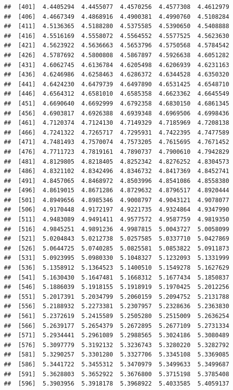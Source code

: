\documentclass[
  11pt]{report}
\begin{document}
\begin{itemize}
\begin{verbatim}
##  [401]  4.4405294  4.4455077  4.4570256  4.4577308  4.4612979
##  [406]  4.4667349  4.4868916  4.4900381  4.4990760  4.5108284
##  [411]  4.5136365  4.5188280  4.5375585  4.5390650  4.5408888
##  [416]  4.5516169  4.5558072  4.5564552  4.5577525  4.5623630
##  [421]  4.5623922  4.5636663  4.5653796  4.5750568  4.5784542
##  [426]  4.5787692  4.5800808  4.5867897  4.5926638  4.6051282
##  [431]  4.6062745  4.6136784  4.6205498  4.6206939  4.6231163
##  [436]  4.6246986  4.6258463  4.6286372  4.6344528  4.6350320
##  [441]  4.6424230  4.6479739  4.6497890  4.6531425  4.6548710
##  [446]  4.6564312  4.6581010  4.6585358  4.6623362  4.6645549
##  [451]  4.6690640  4.6692999  4.6792358  4.6830150  4.6861345
##  [456]  4.6903817  4.6926388  4.6939348  4.6969506  4.6998436
##  [461]  4.7120374  4.7124130  4.7149329  4.7185969  4.7208138
##  [466]  4.7241322  4.7265717  4.7295931  4.7422395  4.7477589
##  [471]  4.7481493  4.7570074  4.7573205  4.7615695  4.7671452
##  [476]  4.7711723  4.7819161  4.7890737  4.7900610  4.7942829
##  [481]  4.8129805  4.8218405  4.8252342  4.8276252  4.8304573
##  [486]  4.8321102  4.8342496  4.8346732  4.8417369  4.8452741
##  [491]  4.8457065  4.8468972  4.8503996  4.8541086  4.8558380
##  [496]  4.8619015  4.8671286  4.8729632  4.8796517  4.8920444
##  [501]  4.8949656  4.8985346  4.9008797  4.9043121  4.9078077
##  [506]  4.9170448  4.9172197  4.9221735  4.9324864  4.9347990
##  [511]  4.9483089  4.9491411  4.9577572  4.9587759  4.9819350
##  [516]  4.9845251  4.9891236  4.9987815  5.0043727  5.0058099
##  [521]  5.0204843  5.0212738  5.0257585  5.0337710  5.0427869
##  [526]  5.0644725  5.0740285  5.0825581  5.0853822  5.0911873
##  [531]  5.0923995  5.0980330  5.1048327  5.1232093  5.1331999
##  [536]  5.1358912  5.1364523  5.1400510  5.1549278  5.1627629
##  [541]  5.1630430  5.1647481  5.1668312  5.1677434  5.1850837
##  [546]  5.1886039  5.1918155  5.1918919  5.1970425  5.2012256
##  [551]  5.2017391  5.2034799  5.2060159  5.2094752  5.2131788
##  [556]  5.2188932  5.2273381  5.2307957  5.2328636  5.2363830
##  [561]  5.2372619  5.2415589  5.2505280  5.2515009  5.2636254
##  [566]  5.2639177  5.2654379  5.2672895  5.2677109  5.2731334
##  [571]  5.2934441  5.2961089  5.2988565  5.3024186  5.3080489
##  [576]  5.3097779  5.3192132  5.3236743  5.3280220  5.3282792
##  [581]  5.3290257  5.3301280  5.3327706  5.3345108  5.3369085
##  [586]  5.3441722  5.3455312  5.3470979  5.3499633  5.3499687
##  [591]  5.3628803  5.3652922  5.3676800  5.3715198  5.3785408
##  [596]  5.3903956  5.3918178  5.3968922  5.4033585  5.4059137

\end{verbatim}
\end{itemize}
\end{document}
